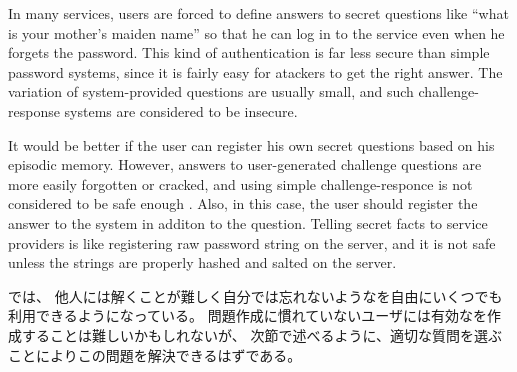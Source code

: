\documentclass{article}
\begin{document}

In many services, users are forced to define answers to secret questions like
``what is your mother's maiden name''
so that he can log in to the service even when he forgets the password.
This kind of authentication is far less secure than simple password systems,
since it is fairly easy for atackers to get the right answer.
The variation of system-provided questions are usually small, and
such challenge-response systems are considered to be insecure\cite{Rabkin:2008:PKQ:1408664.1408667}.

It would be better if the user can register his own secret questions
based on his episodic memory.
However, answers to user-generated challenge questions are more easily
forgotten or cracked,
and using simple challenge-responce is not considered to be safe enough
\cite{Just:2009:PCC:1572532.1572543}\cite{Schechter:2009:NSM:1607723.1608145}.
%
Also, in this case,
the user should register the answer to the system in additon to the question.
Telling secret facts to service providers is like
registering raw password string on the server,
and it is not safe unless the strings are properly hashed and salted on the server.

%
%

{\EP}では、
他人には解くことが難しく自分では忘れないような{\SQ}を自由にいくつでも利用できるようになっている。
問題作成に慣れていないユーザには有効な{\SQ}を作成することは難しいかもしれないが、
次節で述べるように、適切な質問を選ぶことによりこの問題を解決できるはずである。
\end{document}
